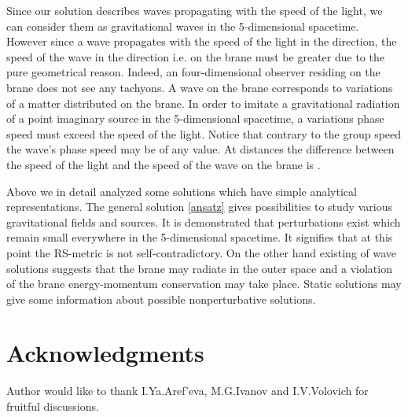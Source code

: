 \documentclass[letterpaper,12pt]{article}
\begin{document}
Since our solution describes waves propagating with the speed of
the light, we can consider them as gravitational waves in the
5-dimensional spacetime. However since a wave propagates with the
speed of the light in the \coordHE{} direction, the speed of the wave in
the \coordHE{} direction i.e. on the brane must be greater due to the
pure geometrical reason. Indeed, an four-dimensional observer
residing on the brane does not see any tachyons. A wave on the
brane corresponds to variations of a matter distributed on the
brane. In order to imitate a gravitational radiation of a  point
imaginary source in the 5-dimensional spacetime, a variations
phase speed must exceed the speed  of the light.  Notice that
contrary to the group speed the wave's phase speed may be of any
value. At distances \coordHE{} the difference between the speed of
the light  and the speed of the wave on the brane is \coordHE{}.

\bigskip
Above we in detail analyzed some solutions which have simple
analytical representations. The general solution \eqref{ansatz}
gives possibilities to study various gravitational fields and
sources. It is demonstrated that perturbations exist which remain
small everywhere in the 5-dimensional spacetime. It signifies that
at this point the RS-metric is not self-contradictory. On the
other hand existing of wave solutions suggests that the brane may
radiate in the outer space and a violation of the brane
energy-momentum conservation may take place. Static solutions may
give some information about possible nonperturbative solutions.

\section*{Acknowledgments}
Author would like to thank I.Ya.Aref'eva, M.G.Ivanov and
I.V.Volovich for fruitful discussions.
\end{document}
